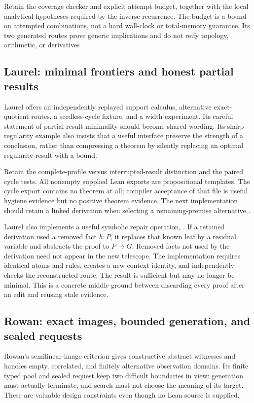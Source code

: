\documentclass[11pt,letterpaper]{article}
\newcommand{\code}[1]{\texttt{\detokenize{#1}}}
\theoremstyle{definition}\newtheorem{definition}[proposition]{Definition}
\theoremstyle{remark}\newtheorem{remark}[proposition]{Remark}
\begin{document}
Retain the coverage checker and explicit attempt budget, together with the
local analytical hypotheses required by the inverse recurrence. The budget
is a bound on attempted combinations, not a hard wall-clock or total-memory
guarantee. Its two generated routes prove generic implications and do not
reify topology, arithmetic, or derivatives \cite{juniper}.

\subsection{Laurel: minimal frontiers and honest partial results}

Laurel offers an independently replayed support calculus, alternative
exact-quotient routes, a seedless-cycle fixture, and a width experiment. Its
careful statement of partial-result minimality should become shared wording.
Its sharp-regularity example also insists that a useful interface preserve
the strength of a conclusion, rather than compressing a theorem by silently
replacing an optimal regularity result with a bound.

Retain the complete-profile versus interrupted-result distinction and the
paired cycle tests. All nonempty supplied Lean exports are propositional
templates. The cycle export contains no theorem at all; compiler acceptance
of that file is useful hygiene evidence but no positive theorem evidence.
The next implementation should retain a linked derivation when selecting a
remaining-premise alternative \cite{laurel}.

Laurel also implements a useful symbolic repair operation, \code{reopen_known}.
If a retained derivation used a removed fact $h:P$, it replaces that known
leaf by a residual variable and abstracts the proof to $P\to G$. Removed
facts not used by the derivation need not appear in the new telescope. The
implementation requires identical atoms and rules, creates a new context
identity, and independently checks the reconstructed route. The result is
sufficient but may no longer be minimal. This is a concrete middle ground
between discarding every proof after an edit and reusing stale evidence.

\subsection{Rowan: exact images, bounded generation, and sealed requests}

Rowan's semilinear-image criterion gives constructive abstract witnesses and
handles empty, correlated, and finitely alternative observation domains.
Its finite typed pool and sealed request keep two difficult boundaries in
view: generation must actually terminate, and search must not choose the
meaning of its target. These are valuable design constraints even though
no Lean source is supplied.
\end{document}
